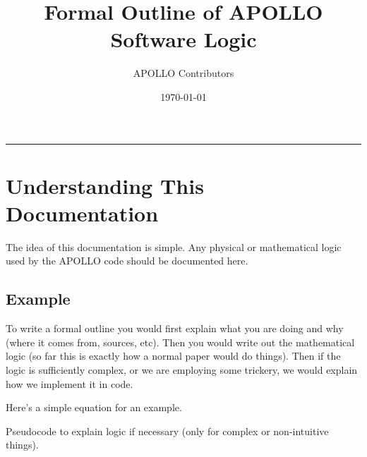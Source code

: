 




\settings
{}

\title{Formal Outline of APOLLO Software Logic}
\author{\Large{APOLLO Contributors}
\smallskip\\ %
}
\date{\today}
\maketitle

\thispagestyle{titlepage}


\rule

\tableofcontents

\settings
\newpage

\section{Understanding This Documentation}

The idea of this documentation is simple. Any physical or mathematical logic
used by the APOLLO code should be documented here. 

\subsection{Example}

To write a formal outline you would first explain
what you are doing and why (where it comes from, sources, etc). Then you would
write out the mathematical logic (so far this is exactly how a normal paper
would do things). Then if the logic is sufficiently complex, or we are
employing some trickery, we would explain how we implement it in code.

Here's a simple equation for an example.


Pseudocode to explain logic if necessary (only for complex or non-intuitive
things).

